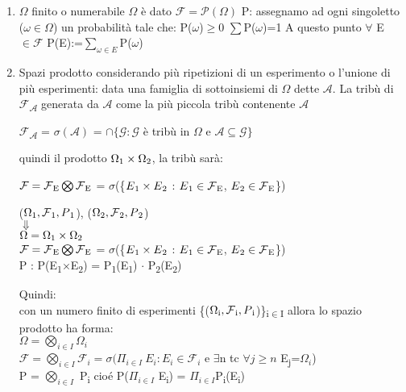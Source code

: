 \documentclass[11pt, letterpaper]{article}
\def\SB#1{\textsubscript{#1}}
\begin{document}
\begin{enumerate}
    \item $\Omega$ finito o numerabile
    \subitem $\Omega$ è dato 
    \subitem $\mathcal{F}=\mathcal{P}(\Omega)$
    \subitem P: assegnamo ad ogni singoletto ($\omega\in\Omega$) un probabilità tale che:
    \subsubitem P($\omega$)$\geq$0
    \subsubitem $\sum$P($\omega$)=1
    \subitem A questo punto $\forall$ E $\in\mathcal{F}$ P(E):=$\sum_{\omega\in E}$P($\omega$)
    \item Spazi prodotto
    \subitem considerando più ripetizioni di un esperimento o l'unione di più esperimenti:
    data una famiglia di sottoinsiemi di $\Omega$ dette $\mathcal{A}$. La tribù di $\mathcal{F}$\SB{$\mathcal{A}$}
    generata da $\mathcal{A}$ come la più piccola tribù contenente $\mathcal{A}$
    \begin{center}
        $\mathcal{F}$\SB{$\mathcal{A}$} = $\sigma (\mathcal{A})$ = $\cap \{\mathcal{G} : \mathcal{G}$ è
          tribù in $\Omega$ e $\mathcal{A} \subseteq \mathcal{G}\}$
    \end{center}
    quindi il prodotto $\Omega\SB{1}\times\Omega\SB{2}$, la tribù sarà:
    \begin{center}
        $\mathcal{F}  =  \mathcal{F}\SB{E}\bigotimes\mathcal{F}\SB{E}$ = 
        $\sigma$(\{$E\SB{1}\times E\SB{2}$ : $E\SB{1}\in\mathcal{F}\SB{E}$, $E\SB{2}\in\mathcal{F}\SB{E}$\})


        ($\Omega\SB{1}, \mathcal{F}\SB{1}, P\SB{1}$), ($\Omega\SB{2}, \mathcal{F}\SB{2}, P\SB{2}$)
        \\$\Downarrow$\\
        $\Omega = \Omega\SB{1}\times\Omega\SB{2}$\\
        $\mathcal{F}  =  \mathcal{F}\SB{E}\bigotimes\mathcal{F}\SB{E}$ = 
        $\sigma$(\{$E\SB{1}\times E\SB{2}$ : $E\SB{1}\in\mathcal{F}\SB{E}$, $E\SB{2}\in\mathcal{F}\SB{E}$\})\\
        P : P(E\SB{1}$\times$E\SB{2}) = P\SB{1}(E\SB{1}) $\cdot$ P\SB{2}(E\SB{2})
    \end{center}

    Quindi:\\
    con un numero finito di esperimenti \{($\Omega\SB{i}, \mathcal{F}\SB{i}, P\SB{i}$)\}\SB{i$\in$I}
    allora lo spazio prodotto ha forma:\\
    $\Omega  =  \bigotimes_{i\in I} \Omega_{i}$\\
    $\mathcal{F}  =  \bigotimes_{i\in I} \mathcal{F}_{i}  =  \sigma (\Pi_{i\in I}\ E_{i}: E_{i}\in\mathcal{F}_{i}$ e $\exists$n tc $\forall j\geq n$ E\SB{j}=$\Omega_{i}$)\\
    P = $\bigotimes_{i\in I}$ P\SB{i} cioé P($\Pi_{i\in I}$ E\SB{i}) = $\Pi_{i\in I}$P\SB{i}(E\SB{i})

\end{enumerate}
\end{document}
